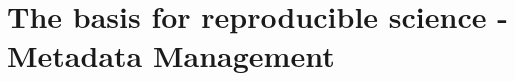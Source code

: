 \clearpage
\section{The basis for reproducible science - Metadata Management}
\label{sec:Metadata}


% 
% 
% 
